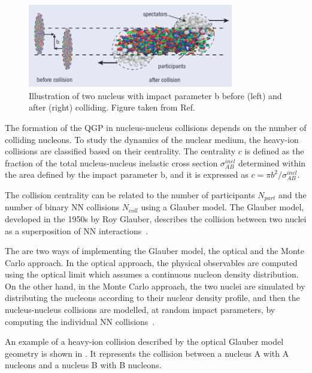 \begin{figure}[!htbp]
 \begin{center}
  \includegraphics[width=0.8\textwidth]{Figures/Introduction/HeavyIons/CollisionGeometry.jpg}
 \end{center}
 \caption{Illustration of two nucleus with impact parameter b before (left) and after (right) colliding. Figure taken from Ref.~\cite{QCDPhaseDiagram}}
 \label{fig:CollisionGeometry}
\end{figure}

The formation of the QGP in nucleus-nucleus collisions depends on the number of colliding nucleons. To study the dynamics of the nuclear medium, the heavy-ion collisions are classified based on their centrality. The centrality $c$ is defined as the fraction of the total nucleus-nucleus inelastic cross section $\sigma^{inel}_{AB}$ determined within the area defined by the impact parameter b, and it is  expressed as $c = {\pi}b^{2}/\sigma^{inel}_{AB}$.

The collision centrality can be related to the number of participants $N_{part}$ and the number of binary NN collisions $N_{coll}$ using a Glauber model. The Glauber model, developed in the 1950s by Roy Glauber, describes the collision between two nuclei as a superposition of NN interactions~\cite{GlauberModel}.

The are two ways of implementing the Glauber model, the optical and the Monte Carlo approach. In the optical approach, the physical observables are computed using the optical limit which assumes a continuous nucleon density distribution. On the other hand, in the Monte Carlo approach, the two nuclei are simulated by distributing the nucleons according to their nuclear density profile, and then the nucleus-nucleus collisions are modelled, at random impact parameters, by computing the individual NN collisions~\cite{GlauberModel}.

An example of a heavy-ion collision described by the optical Glauber model geometry is shown in . It represents the collision between a nucleus A with A nucleons and a nucleus B with B nucleons.

